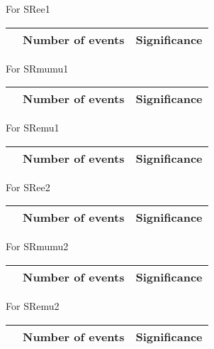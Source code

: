 \begin{frame}{For SRee1}
\vspace{5mm}
\begin{tabular}{|c|c|c|}
\hline
& Number of events & Significance \\
\hline

\end{tabular}
\end{frame}

\begin{frame}{For SRmumu1}
\vspace{5mm}
\begin{tabular}{|c|c|c|}
\hline
& Number of events & Significance \\
\hline

\end{tabular}
\end{frame}

\begin{frame}{For SRemu1}
\vspace{5mm}
\begin{tabular}{|c|c|c|}
\hline
& Number of events & Significance \\
\hline

\end{tabular}
\end{frame}

\begin{frame}{For SRee2}
\vspace{5mm}
\begin{tabular}{|c|c|c|}
\hline
& Number of events & Significance \\
\hline

\end{tabular}
\end{frame}

\begin{frame}{For SRmumu2}
\vspace{5mm}
\begin{tabular}{|c|c|c|}
\hline
& Number of events & Significance \\
\hline

\end{tabular}
\end{frame}

\begin{frame}{For SRemu2}
\vspace{5mm}
\begin{tabular}{|c|c|c|}
\hline
& Number of events & Significance \\
\hline

\end{tabular}
\end{frame}

